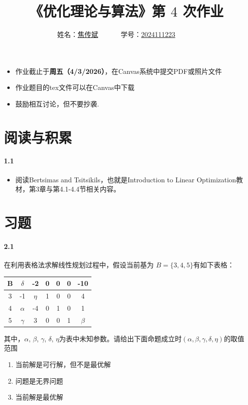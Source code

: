 \documentclass[12pt,a4paper]{article}
\begin{document}
\title{
{《优化理论与算法》第 {$4$} 次作业
}
}
\date{}

 \author{
 姓名：\underline{焦传斌}~~~~~~
 学号：\underline{2024111223}~~~~~~}

\maketitle

\begin{itemize}
	\item 作业截止于{\bf 周五（4/3/2026）}，在Canvas系统中提交PDF或照片文件
	\item 作业题目的tex文件可以在Canvas中下载
	\item 鼓励相互讨论，但不要抄袭.
\end{itemize}

\section{阅读与积累}
\paragraph{1.1}
\begin{itemize}
	\item 阅读Bertsimas and Tsitsikils，也就是Introduction to Linear Optimization教材，第3章与第4.1-4.4节相关内容。
\end{itemize}

\section{习题}


\paragraph{2.1}
在利用表格法求解线性规划过程中，假设当前基为 $B=\{3,4,5\}$有如下表格：
\begin{center}
	\begin{tabular}{|c| c c c c c |c|} 
		\hline
		B & $\delta$ &-2 &0 &0 &0 & -10 \\
		\hline
		3 & -1 & $\eta$ &1 &0 &0 & 4 \\
		4 & $\alpha$ & -4 &0 &1 &0 & 1 \\
		5 & $\gamma$ & 3 &0 &0 &1 & $\beta$ \\
		\hline
	\end{tabular}
\end{center}
其中，$\alpha$, $\beta$, $\gamma$, $\delta$, $\eta$为表中未知参数。请给出下面命题成立时$(\alpha, \beta, \gamma, \delta, \eta)$的取值范围
\begin{enumerate}
	\item 当前解是可行解，但不是最优解
	\item 问题是无界问题
	\item 当前解是最优解
\end{enumerate}
\end{document}

